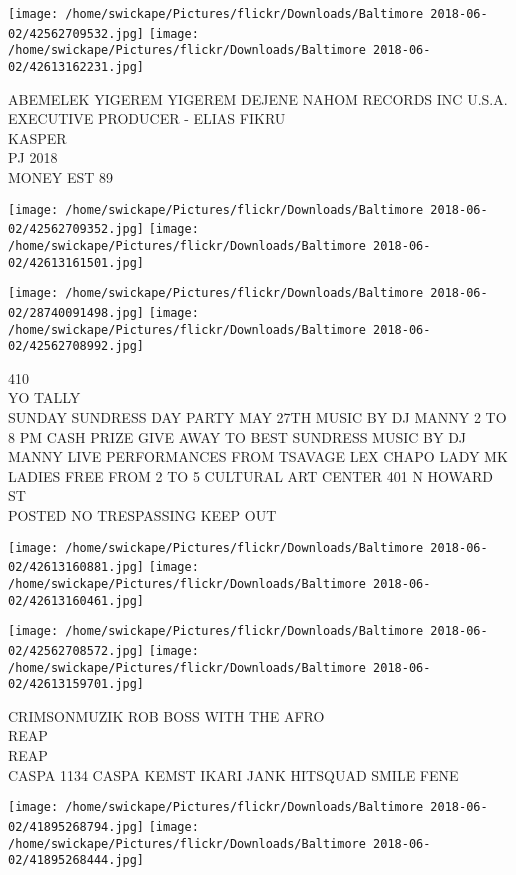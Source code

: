 \documentclass[10pt,letterpaper]{article}
\begin{document}
\texttt{[image: /home/swickape/Pictures/flickr/Downloads/Baltimore 2018-06-02/42562709532.jpg]}
\texttt{[image: /home/swickape/Pictures/flickr/Downloads/Baltimore 2018-06-02/42613162231.jpg]}

ABEMELEK YIGEREM YIGEREM DEJENE NAHOM RECORDS INC U.S.A. EXECUTIVE PRODUCER {-} ELIAS FIKRU\\
KASPER\\
PJ 2018\\
MONEY EST 89
\pagebreak

\texttt{[image: /home/swickape/Pictures/flickr/Downloads/Baltimore 2018-06-02/42562709352.jpg]}
\texttt{[image: /home/swickape/Pictures/flickr/Downloads/Baltimore 2018-06-02/42613161501.jpg]}

\texttt{[image: /home/swickape/Pictures/flickr/Downloads/Baltimore 2018-06-02/28740091498.jpg]}
\texttt{[image: /home/swickape/Pictures/flickr/Downloads/Baltimore 2018-06-02/42562708992.jpg]}

410\\
YO TALLY\\
SUNDAY SUNDRESS DAY PARTY MAY 27TH MUSIC BY DJ MANNY 2 TO 8 PM CASH PRIZE GIVE AWAY TO BEST SUNDRESS MUSIC BY DJ MANNY LIVE PERFORMANCES FROM TSAVAGE LEX CHAPO LADY MK LADIES FREE FROM 2 TO 5 CULTURAL ART CENTER 401 N HOWARD ST\\
POSTED NO TRESPASSING KEEP OUT
\pagebreak

\texttt{[image: /home/swickape/Pictures/flickr/Downloads/Baltimore 2018-06-02/42613160881.jpg]}
\texttt{[image: /home/swickape/Pictures/flickr/Downloads/Baltimore 2018-06-02/42613160461.jpg]}

\texttt{[image: /home/swickape/Pictures/flickr/Downloads/Baltimore 2018-06-02/42562708572.jpg]}
\texttt{[image: /home/swickape/Pictures/flickr/Downloads/Baltimore 2018-06-02/42613159701.jpg]}

CRIMSONMUZIK ROB BOSS WITH THE AFRO\\
REAP\\
REAP\\
CASPA 1134 CASPA KEMST IKARI JANK HITSQUAD SMILE FENE
\pagebreak

\texttt{[image: /home/swickape/Pictures/flickr/Downloads/Baltimore 2018-06-02/41895268794.jpg]}
\texttt{[image: /home/swickape/Pictures/flickr/Downloads/Baltimore 2018-06-02/41895268444.jpg]}
\end{document}
